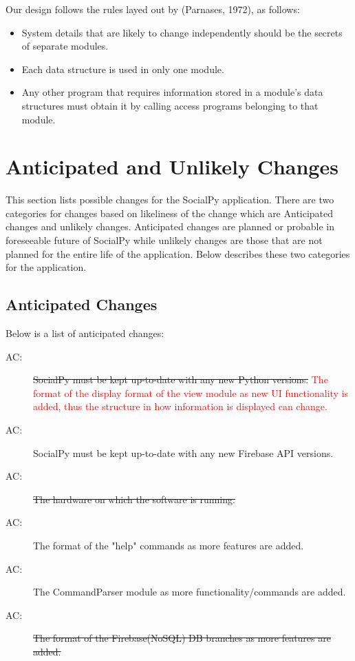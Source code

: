 \documentclass[12pt, titlepage]{article}
\newcounter{acnum}
\newcommand{\actheacnum}{AC\theacnum}
\begin{document}
Our design follows the rules layed out by (Parnases, 1972), as follows:
\begin{itemize}
\item System details that are likely to change independently should be the
  secrets of separate modules.
\item Each data structure is used in only one module.
\item Any other program that requires information stored in a module's data
  structures must obtain it by calling access programs belonging to that module.
\end{itemize}

\section{Anticipated and Unlikely Changes} \label{SecChange}
This section lists possible changes for the SocialPy application. There are two categories for changes based on likeliness of the change which are Anticipated changes and unlikely changes. Anticipated changes are planned or probable in foreseeable future of SocialPy while unlikely changes are those that are not planned for the entire life of the application. Below describes these two categories for the application.

\subsection{Anticipated Changes} \label{SecAchange}
Below is a list of anticipated changes:

\begin{description}
\item[ \actheacnum \label{ac1}:] \sout{SocialPy must be kept up-to-date with any new Python versions.} \textcolor{red}{The format of the display format of the view module as new UI functionality is added, thus the structure in how information is displayed can change.}
\item[ \actheacnum \label{ac2}:] SocialPy must be kept up-to-date with any new Firebase API versions.
\item[ \actheacnum \label{ac3}:] \sout{The hardware on which the software is running.}
\item[ \actheacnum \label{ac4}:] The format of the "help" commands as more features are added.
\item[ \actheacnum \label{ac5}:] The CommandParser module as more functionality/commands are added.
\item[ \actheacnum \label{ac6}:] \sout{The format of the Firebase(NoSQL) DB branches as more features are added.}
\end{description}
\end{document}
